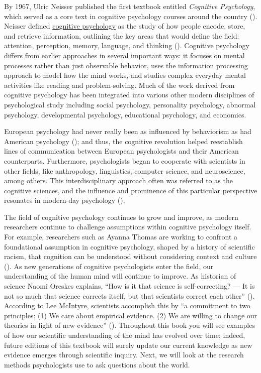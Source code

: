 \documentclass[
]{krantz}
\begin{document}
By 1967, Ulric Neisser published the first textbook entitled \emph{Cognitive Psychology}, which served as a core text in cognitive psychology courses around the country (). Neisser defined \hyperref[cognitive-psychology]{cognitive psychology} as the study of how people encode, store, and retrieve information, outlining the key areas that would define the field: attention, perception, memory, language, and thinking (). Cognitive psychology differs from earlier approaches in several important ways: it focuses on mental processes rather than just observable behavior, uses the information processing approach to model how the mind works, and studies complex everyday mental activities like reading and problem-solving. Much of the work derived from cognitive psychology has been integrated into various other modern disciplines of psychological study including social psychology, personality psychology, abnormal psychology, developmental psychology, educational psychology, and economics.

European psychology had never really been as influenced by behaviorism as had American psychology (); and thus, the cognitive revolution helped reestablish lines of communication between European psychologists and their American counterparts. Furthermore, psychologists began to cooperate with scientists in other fields, like anthropology, linguistics, computer science, and neuroscience, among others. This interdisciplinary approach often was referred to as the cognitive sciences, and the influence and prominence of this particular perspective resonates in modern-day psychology ().

The field of cognitive psychology continues to grow and improve, as modern researchers continue to challenge assumptions within cognitive psychology itself. For example, researchers such as Ayanna Thomas are working to confront a foundational assumption in cognitive psychology, shaped by a history of scientific racism, that cognition can be understood without considering context and culture (). As new generations of cognitive psychologists enter the field, our understanding of the human mind will continue to improve. As historian of science Naomi Oreskes explains, ``How is it that science is self-correcting? --- It is not so much that science corrects itself, but that scientists correct each other'' (). According to Lee McIntyre, scientists accomplish this by ``a commitment to two principles: (1) We care about empirical evidence. (2) We are willing to change our theories in light of new evidence'' (). Throughout this book you will see examples of how our scientific understanding of the mind has evolved over time; indeed, future editions of this textbook will surely update our current knowledge as new evidence emerges through scientific inquiry. Next, we will look at the research methods psychologists use to ask questions about the world.
\end{document}
